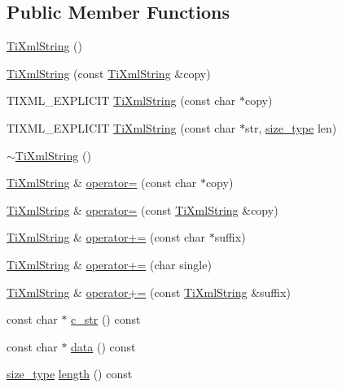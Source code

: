 \subsection*{Public Member Functions}
\begin{DoxyCompactItemize}
\item 
\hyperlink{class_ti_xml_string_a342f61e0fc2244df300b73aedf6d3fef}{TiXmlString} ()
\item 
\hyperlink{class_ti_xml_string_ac80fe17693a438c9ab2591664743fcb6}{TiXmlString} (const \hyperlink{class_ti_xml_string}{TiXmlString} \&copy)
\item 
TIXML\_\-EXPLICIT \hyperlink{class_ti_xml_string_aa3b32bd2891a757c9f36c21db44c81d2}{TiXmlString} (const char $\ast$copy)
\item 
TIXML\_\-EXPLICIT \hyperlink{class_ti_xml_string_a4b17ea5c5db986f14827223dfa8f1547}{TiXmlString} (const char $\ast$str, \hyperlink{class_ti_xml_string_abeb2c1893a04c17904f7c06546d0b971}{size\_\-type} len)
\item 
\hyperlink{class_ti_xml_string_a7ac03f581ca3422c4808162ab14f3450}{$\sim$TiXmlString} ()
\item 
\hyperlink{class_ti_xml_string}{TiXmlString} \& \hyperlink{class_ti_xml_string_ae0bc6147afc0ec2aa0da3a3c0a8fcfb0}{operator=} (const char $\ast$copy)
\item 
\hyperlink{class_ti_xml_string}{TiXmlString} \& \hyperlink{class_ti_xml_string_ab1f1f5d3eceaa0f22d0a7e6055ea81b0}{operator=} (const \hyperlink{class_ti_xml_string}{TiXmlString} \&copy)
\item 
\hyperlink{class_ti_xml_string}{TiXmlString} \& \hyperlink{class_ti_xml_string_ab56336ac2aa2a08d24a71eb9a2b502a5}{operator+=} (const char $\ast$suffix)
\item 
\hyperlink{class_ti_xml_string}{TiXmlString} \& \hyperlink{class_ti_xml_string_a6aa09d5240470b76d54ec709e04f8c13}{operator+=} (char single)
\item 
\hyperlink{class_ti_xml_string}{TiXmlString} \& \hyperlink{class_ti_xml_string_afdcae5ea2b4d9e194dc21226b817f417}{operator+=} (const \hyperlink{class_ti_xml_string}{TiXmlString} \&suffix)
\item 
const char $\ast$ \hyperlink{class_ti_xml_string_a5581ca641d915551d3cda90f8e7bf49b}{c\_\-str} () const 
\item 
const char $\ast$ \hyperlink{class_ti_xml_string_a00abc60f135c7ca1951c7334cc2c7993}{data} () const 
\item 
\hyperlink{class_ti_xml_string_abeb2c1893a04c17904f7c06546d0b971}{size\_\-type} \hyperlink{class_ti_xml_string_a3202f27d139a3fac79205f1f3c707727}{length} () const 

\end{DoxyCompactItemize}
